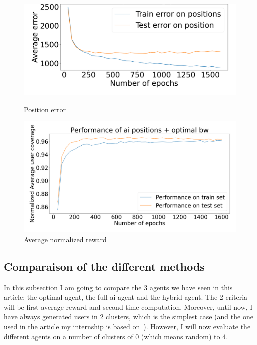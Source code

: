 \documentclass[letterpaper]{article}
\begin{document}
\begin{figure}[H]
    \centering
    \begin{minipage}[b]{0.45\textwidth}
        \centering
        \includegraphics[width=\textwidth]{images/error_pos_variable_user_number.png}
        \caption{Position error}
    \end{minipage}
    \hspace{0.05\textwidth}
    \begin{minipage}[b]{0.45\textwidth}
        \centering
        \includegraphics[width=\textwidth]{images/reward_variable_user_number.png}
        \caption{Average normalized reward}
    \end{minipage}
\end{figure}

\subsection{Comparaison of the different methods}

In this subsection I am going to compare the 3 agents we have seen in this article: the optimal agent, the full-ai agent and the hybrid agent.
The 2 criteria will be first average reward and second time computation.
Moreover, until now, I have always generated users in 2 clusters, which is the simplest case (and the one used in the article my internship is based on \,\cite{main_article}).
However, I will now evaluate the different agents on a number of clusters of 0 (which means random) to 4.
\end{document}
